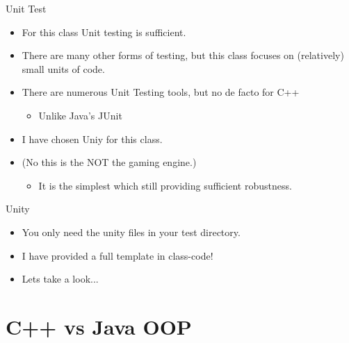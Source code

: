 \documentclass{beamer}
\begin{document}
\begin{frame}{Unit Test}
\begin{itemize}
\item For this class Unit testing is sufficient.
\item There are many other forms of testing, but this class focuses on (relatively) small units of code.
\item There are numerous Unit Testing tools, but no de facto for C++
\begin{itemize}
\item Unlike Java's JUnit
\end{itemize}
\item I have chosen Uniy for this class.
\item (No this is the NOT the gaming engine.)
\begin{itemize}
\item It is the simplest which still providing sufficient robustness.
\end{itemize}
\end{itemize}
\end{frame}

\begin{frame}{Unity}
\begin{itemize}
\item You only need the unity files in your test directory.
\item I have provided a full template in class-code!
\item Lets take a look...
\end{itemize}
\end{frame}

\section{C++ vs Java OOP}
\subsection{}
\end{document}
